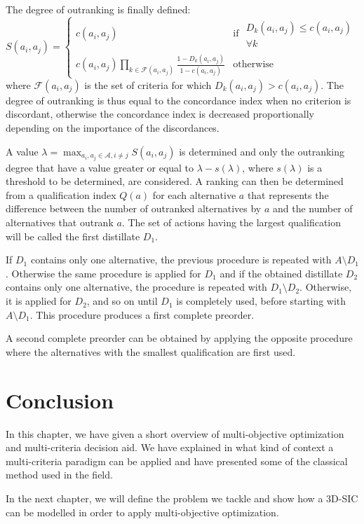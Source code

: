 \begin{enumerate}
The degree of outranking is finally defined:
\begin{equation}
S(a_i,a_j) = \begin{cases}
	c(a_i,a_j) & \text{if } \begin{array}{rr}D_k(a_i,a_j) \leq c(a_i,a_j)\\
		\forall k \end{array}\\
	c(a_i,a_j) \prod_{k \in \mathcal{F}(a_i,a_j)} \frac{1-D_k(a_i,a_j)}{1-c(a_i,a_j)} & \text{otherwise}
	\end{cases}
\end{equation}
where $\mathcal{F}(a_i,a_j)$ is the set of criteria for which $D_k(a_i,a_j) > c(a_i,a_j)$. The degree of outranking is thus equal to the concordance index when no criterion is discordant, otherwise the concordance index is decreased proportionally depending on the importance of the discordances.

A value $\lambda = \max_{a_i,a_j \in \mathcal{A}, i \neq j} S(a_i, a_j)$ is determined and only the outranking degree that have a value greater or equal to $\lambda - s(\lambda)$, where $s(\lambda)$ is a threshold to be determined, are considered. A ranking can then be determined from a qualification index $Q(a)$ for each alternative $a$ that represents the difference between the number of outranked alternatives by $a$ and the number of alternatives that outrank $a$. The set of actions having the largest qualification will be called the first distillate $D_1$.

If $D_1$ contains only one alternative, the previous procedure is repeated with $A \setminus D_1$. Otherwise the same procedure is applied for $D_1$ and if the obtained distillate $D_2$ contains only one alternative, the procedure is repeated with $D_1 \setminus D_2$. Otherwise, it is applied for $D_2$, and so on until $D_1$ is completely used, before starting with $A \setminus D_1$. This procedure produces a first complete preorder.

A second complete preorder can be obtained by applying the opposite procedure where the alternatives with the smallest qualification are first used.

%
\end{enumerate}

\section{Conclusion}
In this chapter, we have given a short overview of multi-objective optimization and multi-criteria decision aid. We have explained in what kind of context a multi-criteria paradigm can be applied and have presented some of the classical method used in the field.

In the next chapter, we will define the problem we tackle and show how a 3D-SIC can be modelled in order to apply multi-objective optimization.